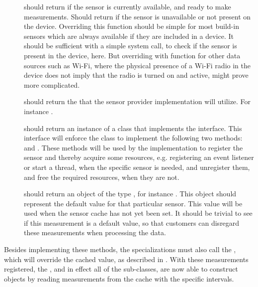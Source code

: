 \begin{description}
	\item[] should return  if the sensor is currently available, and ready to make measurements. Should return  if the sensor is unavailable or not present on the device. Overriding this function should be simple for most build-in sensors which are always available if they are included in a device. It should be sufficient with a simple system call, to check if the sensor is present in the device, here. But overriding with function for other data sources such as Wi-Fi, where the physical presence of a Wi-Fi radio in the device does not imply that the radio is turned on and active, might prove more complicated.   

	\item[] should return the  that the sensor provider implementation will utilize. For instance .

	\item[] should return an instance of a class that implements the  interface. This interface will enforce the class to implement the following two methods:  and . These methods will be used by the  implementation to register the sensor and thereby acquire some resources, e.g. registering an event listener or start a thread, when the specific sensor is needed, and unregister them, and free the required resources, when they are not.

  \item[] should return an object of the type , for instance . This object should represent the default value for that particular sensor. This value will be used when the sensor cache has not yet been set. It should be trivial to see if this measurement is a default value, so that customers can disregard these measurements when processing the data.
\end{description}

Besides implementing these methods, the specializations must also call the , which will override the cached value, as described in . With these measurements registered, the , and in effect all of the sub-classes, are now able to construct  objects by reading measurements from the cache with the specific intervals. 

